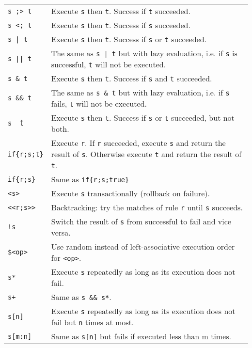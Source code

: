 \begin{table}[htbp]
\begin{minipage}{\linewidth} \renewcommand{\footnoterule}{} 
\begin{tabularx}{\linewidth}{|lX|}
\hline
\texttt{s ;> t}		& Execute \texttt{s} then \texttt{t}. Success if \texttt{t} succeeded.\\
\texttt{s <; t}		& Execute \texttt{s} then \texttt{t}. Success if \texttt{s} succeeded.\\
\texttt{s | t}		& Execute \texttt{s} then \texttt{t}. Success if \texttt{s} or \texttt{t} succeeded.\\
\texttt{s || t}	& The same as \texttt{s | t} but with lazy evaluation, i.e. if \texttt{s} is successful, \texttt{t} will not be executed.\\
\texttt{s \& t}	& Execute \texttt{s} then \texttt{t}. Success if \texttt{s} and \texttt{t} succeeded.\\
\texttt{s \&\& t}	& The same as \texttt{s \& t} but with lazy evaluation, i.e. if \texttt{s} fails, \texttt{t} will not be executed.\\
\texttt{s \^\ t}	& Execute \texttt{s} then \texttt{t}. Success if \texttt{s} or \texttt{t} succeeded, but not both.\\
\texttt{if\{r;s;t\}}	& Execute \texttt{r}. If \texttt{r} succeeded, execute \texttt{s} and return the result of \texttt{s}. Otherwise execute \texttt{t} and return the result of \texttt{t}.\\
\texttt{if\{r;s\}}	& Same as \texttt{if\{r;s;true\}}\\
\texttt{<s>}	& Execute \texttt{s} transactionally (rollback on failure).\\
\texttt{<<r;s>>}	& Backtracking: try the matches of rule \texttt{r} until \texttt{s} succeeds.\\
\texttt{!s}		& Switch the result of \texttt{s} from successful to fail and vice versa.\\
\texttt{\$<op>}	& Use random instead of left-associative execution order for \texttt{<op>}. \\
\texttt{s*}		& Execute \texttt{s} repeatedly as long as its execution does not fail.\\
\texttt{s+}		& Same as \texttt{s \&\& s*}.\\
\texttt{s[n]}	& Execute \texttt{s} repeatedly as long as its execution does not fail but \texttt{n} times at most.\\
\texttt{s[m:n]}	& Same as \texttt{s[n]} but fails if executed less than m times.\\

\end{tabularx}
\end{minipage}
\end{table}
